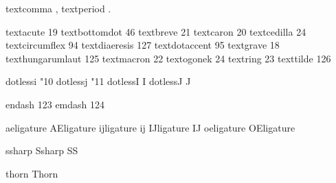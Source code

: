 

\startencoding[default]

 textcomma         ,
 textperiod        .

 textacute         19
 textbottomdot     46
 textbreve         21
 textcaron         20
 textcedilla       24
 textcircumflex    94
 textdiaeresis    127
 textdotaccent     95
 textgrave         18
 texthungarumlaut 125
 textmacron        22
 textogonek        24 %
 textring          23
 texttilde        126

 dotlessi         {\char"10 }
 dotlessj         {\char"11 }
 dotlessI         {I}
 dotlessJ         {J}

 endash           123
 emdash           124

 aeligature       { } %
 AEligature       { } %
 ijligature       {ij}
 IJligature       {IJ}
 oeligature       { } %
 OEligature       { } %

 ssharp           { } %
 Ssharp           {SS}

 thorn            {\missingglyph}
 Thorn            {\missingglyph}

